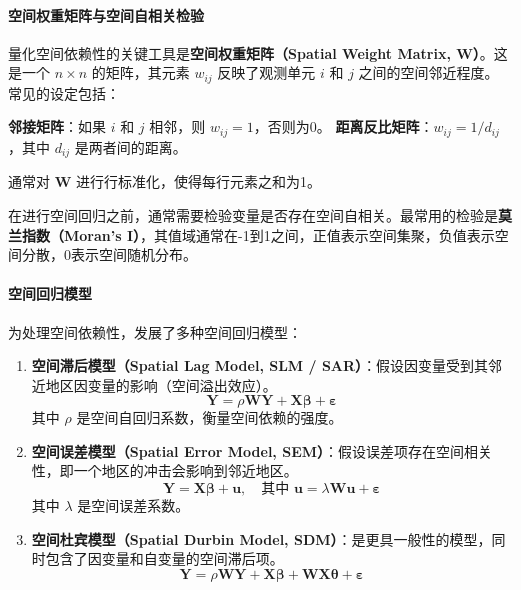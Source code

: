 \paragraph*{空间权重矩阵与空间自相关检验}
量化空间依赖性的关键工具是\textbf{空间权重矩阵（Spatial Weight Matrix, W）}。这是一个 $n \times n$ 的矩阵，其元素 $w_{ij}$ 反映了观测单元 $i$ 和 $j$ 之间的空间邻近程度。常见的设定包括：

\textbf{邻接矩阵}：如果 $i$ 和 $j$ 相邻，则 $w_{ij}=1$，否则为0。
\textbf{距离反比矩阵}：$w_{ij} = 1/d_{ij}$，其中 $d_{ij}$ 是两者间的距离。

通常对 $\mathbf{W}$ 进行行标准化，使得每行元素之和为1。

在进行空间回归之前，通常需要检验变量是否存在空间自相关。最常用的检验是\textbf{莫兰指数（Moran's I）}，其值域通常在-1到1之间，正值表示空间集聚，负值表示空间分散，0表示空间随机分布。

\paragraph*{空间回归模型}
为处理空间依赖性，发展了多种空间回归模型：
\begin{enumerate}
    \item \textbf{空间滞后模型（Spatial Lag Model, SLM / SAR）}：假设因变量受到其邻近地区因变量的影响（空间溢出效应）。
    \begin{equation}
    \mathbf{Y} = \rho \mathbf{W}\mathbf{Y} + \mathbf{X}\boldsymbol{\beta} + \boldsymbol{\varepsilon}
    \end{equation}
    其中 $\rho$ 是空间自回归系数，衡量空间依赖的强度。

    \item \textbf{空间误差模型（Spatial Error Model, SEM）}：假设误差项存在空间相关性，即一个地区的冲击会影响到邻近地区。
    \begin{equation}
    \mathbf{Y} = \mathbf{X}\boldsymbol{\beta} + \mathbf{u}, \quad \text{其中 } \mathbf{u} = \lambda \mathbf{W}\mathbf{u} + \boldsymbol{\varepsilon}
    \end{equation}
    其中 $\lambda$ 是空间误差系数。

    \item \textbf{空间杜宾模型（Spatial Durbin Model, SDM）}：是更具一般性的模型，同时包含了因变量和自变量的空间滞后项。
    \begin{equation}
    \mathbf{Y} = \rho \mathbf{W}\mathbf{Y} + \mathbf{X}\boldsymbol{\beta} + \mathbf{W}\mathbf{X}\boldsymbol{\theta} + \boldsymbol{\varepsilon}
    \end{equation}
\end{enumerate}

